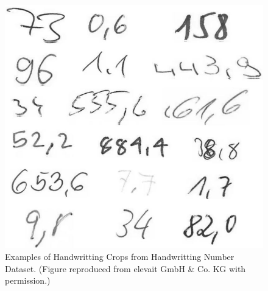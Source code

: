 \begin{figure}[H]
        \begin{center}
    	\includegraphics[scale=0.45]{images/keinwifi.JPG}
	    \caption[Examples of Handwritting Crops from the Handwritting Number Dataset.]{Examples of Handwritting Crops from Handwritting Number Dataset. (Figure reproduced from elevait GmbH \& Co. KG with permission.)}
	    \label{fig:keinwifi}
	    \end{center}
\end{figure}


